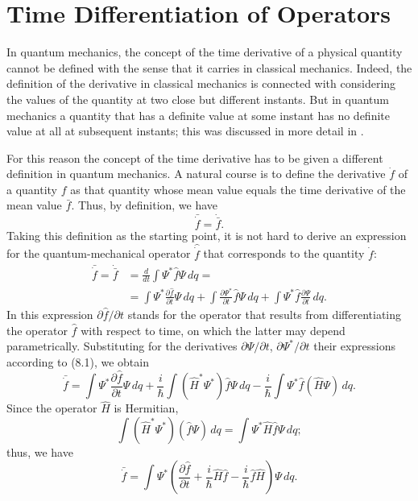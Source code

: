 \section{Time Differentiation of Operators}

In quantum mechanics, the concept of the time derivative of a physical
quantity cannot be defined with the sense that it carries in classical
mechanics. Indeed, the
definition of the derivative in classical mechanics is connected with
considering the values of the quantity at two close but different instants.
But in quantum mechanics a quantity that has a definite value at some instant
has no definite value at all at subsequent instants; this was discussed
in more detail in .

For this reason the concept of the time derivative has to be given a
different definition in quantum mechanics. A natural course is to define the
derivative $\dot f$ of a quantity $f$ as that quantity whose mean value
equals the time derivative of the mean value $\bar f$. Thus, by definition,
we have
\begin{equation}
  \bar{\dot f}=\dot{\bar f}.
  \tag{9.1}
\end{equation}
Taking this definition as the starting point, it is not hard to derive an
expression for the quantum-mechanical operator $\hat{\dot f}$ that
corresponds to%
the quantity $\dot f$:
\[
  \begin{aligned}
    \bar{\dot f}=\dot{\bar f}
      &=\frac{d}{dt}\int\Psi^*\hat f\Psi\,dq={}\\
      &=\int\Psi^*\frac{\partial\hat f}{\partial t}\Psi\,dq
       +\int\frac{\partial\Psi^*}{\partial t}\hat f\Psi\,dq
       +\int\Psi^*\hat f\frac{\partial\Psi}{\partial t}\,dq.
  \end{aligned}
\]
In this expression $\partial\hat f/\partial t$ stands for the operator that
results from differentiating the operator $\hat f$ with respect to time, on
which the latter may depend parametrically. Substituting for the derivatives $\partial\Psi/\partial t$,
$\partial\Psi^*/\partial t$ their expressions according to (8.1), we obtain
\[
  \bar{\dot f}
  =\int\Psi^*\frac{\partial\hat f}{\partial t}\Psi\,dq
  +\frac{i}{\hbar}\int(\hat H^*\Psi^*)\hat f\Psi\,dq
  -\frac{i}{\hbar}\int\Psi^*\hat f(\hat H\Psi)\,dq.
\]
Since the operator $\hat H$ is Hermitian,
\[
  \int(\hat H^*\Psi^*)(\hat f\Psi)\,dq
  =\int\Psi^*\hat H\hat f\Psi\,dq;
\]
thus, we have
\[
  \bar{\dot f}
  =\int\Psi^*\left(
    \frac{\partial\hat f}{\partial t}
    +\frac{i}{\hbar}\hat H\hat f
    -\frac{i}{\hbar}\hat f\hat H
  \right)\Psi\,dq.
\]

